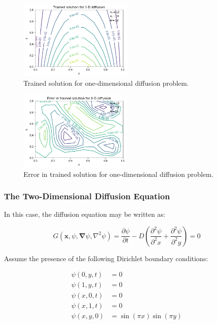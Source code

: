 \documentclass{article}
\begin{document}
\begin{figure}
    \centering
    \includegraphics[width=0.5\textwidth]{figures/diff1d_trained.png}
    \caption{Trained solution for one-dimensional diffusion problem.}
    \label{fig:diff1d_trained}
\end{figure}

\begin{figure}
    \centering
    \includegraphics[width=0.5\textwidth]{figures/diff1d_error.png}
    \caption{Error in trained solution for one-dimensional diffusion problem.}
    \label{fig:diff1d_error}
\end{figure}

\subsubsection{The Two-Dimensional Diffusion Equation}

In this case, the diffusion equation may be written as:

\begin{equation}
  G \left( \mathbf x, \psi, \mathbf \nabla \psi, \nabla^2 \psi \right) = \frac {\partial \psi} {\partial t} - D \left( \frac {\partial^2 \psi} {\partial^2 x} +  \frac {\partial^2 \psi} {\partial^2 y} \right) = 0
\end{equation}

Assume the presence of the following Dirichlet boundary conditions:

\begin{equation}
\begin{split}
  \psi(0,y,t) &= 0 \\
  \psi(1,y,t) &= 0 \\
  \psi(x,0,t) &= 0 \\
  \psi(x,1,t) &= 0 \\
  \psi(x,y,0) &= \sin(\pi x) \sin(\pi y)
\end{split}
\end{equation}
\end{document}

